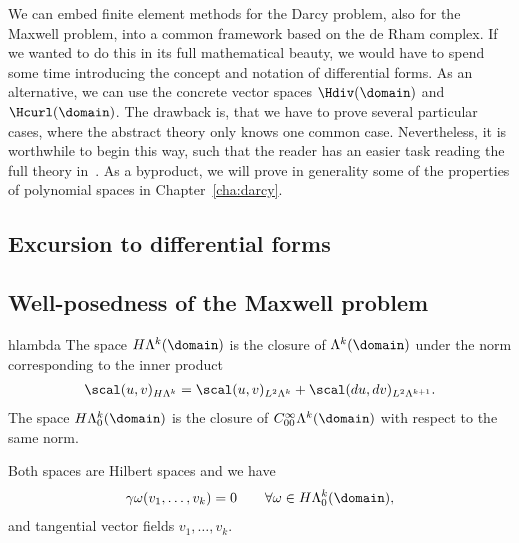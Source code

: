 \begin{intro}
  We can embed finite element methods for the Darcy problem, also for
  the Maxwell problem, into a common framework based on the de Rham
  complex. If we wanted to do this in its full mathematical beauty, we
  would have to spend some time introducing the concept and notation
  of differential forms. As an alternative, we can use the concrete
  vector spaces $\Hdiv(\domain)$ and $\Hcurl(\domain)$. The drawback
  is, that we have to prove several particular cases, where the
  abstract theory only knows one common case. Nevertheless, it is
  worthwhile to begin this way, such that the reader has an easier
  task reading the full theory
  in~\cite{ArnoldFalkWinther06acta,ArnoldFalkWinther10}. As a byproduct,
  we will prove in generality some of the properties of polynomial
  spaces in Chapter~\ref{cha:darcy}.
\end{intro}

\subsection{Excursion to differential forms}



\subsection{Well-posedness of the Maxwell problem}

\begin{Definition}{hlambda}
  The space $H\Lambda^k(\domain)$ is the closure of $\Lambda^k(\domain)$
  under the norm corresponding to the inner product
  \begin{gather}
    \scal(u,v)_{H\Lambda^k}
    = \scal(u,v)_{L^2\Lambda^k}
    + \scal(d u, d v)_{L^2\Lambda^{k+1}}.
  \end{gather}
  The space $H\Lambda^k_0(\domain)$ is the closure of
  $C^{\infty}_{00}\Lambda^k(\domain)$ with respect to the same norm.

  Both spaces are Hilbert spaces and we have
  \begin{gather}
    \gamma\omega(v_1,\dots,v_k) = 0 \qquad
    \forall \omega\in H\Lambda^k_0(\domain),
  \end{gather}
  and tangential vector fields $v_1,\dots,v_k$.
\end{Definition}

